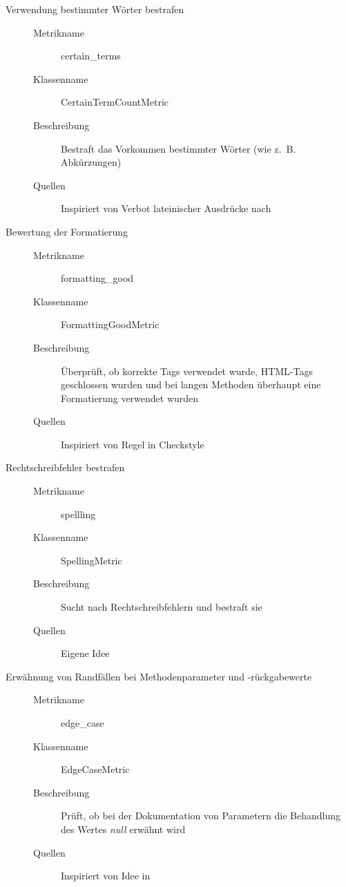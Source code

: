 \begin{appendices}
\begin{description}
\item[Verwendung bestimmter Wörter bestrafen]
\begin{description}
\item[]
    \item [Metrikname]  certain\_terms
    \item [Klassenname] CertainTermCountMetric
    \item[Beschreibung]  Bestraft das Vorkommen bestimmter Wörter (wie z.~B. Abkürzungen)
     \item[Quellen] Inspiriert von Verbot lateinischer Ausdrücke nach \cite{HowtoWriteDocCommentsfortheJavadocTool}
\end{description}

\item[Bewertung der Formatierung]
\begin{description}
\item[]
    \item [Metrikname]  formatting\_good
    \item [Klassenname] FormattingGoodMetric
    \item[Beschreibung] Überprüft, ob korrekte Tags verwendet wurde, HTML-Tags geschlossen wurden und bei langen Methoden überhaupt eine Formatierung verwendet wurden
     \item[Quellen] Inspiriert von Regel in Checkstyle \cite{checkstyle_doc_metrics}
\end{description}


\item[Rechtschreibfehler bestrafen] 

\begin{description}
\item[]
    \item [Metrikname]  spellling
    \item [Klassenname] SpellingMetric
    \item[Beschreibung]Sucht nach Rechtschreibfehlern und bestraft sie
    \item[Quellen] Eigene Idee
\end{description}

\item[Erwähnung von Randfällen bei Methodenparameter
und -rückgabewerte]
\begin{description}
\item[]
    \item [Metrikname]  edge\_case
    \item [Klassenname] EdgeCaseMetric
    \item[Beschreibung] Prüft, ob bei der Dokumentation von Parametern die Behandlung des Wertes \textit{null} erwähnt wird
       \item[Quellen] Inspiriert von Idee in  \cite{javadoc_coding_standards}
\end{description}



\end{description}
\end{appendices}
